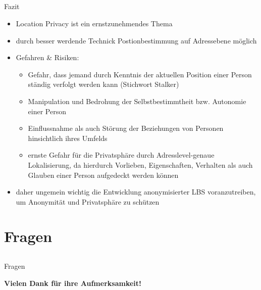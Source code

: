 \subsection{}
\begin{frame}{Fazit}
\begin{itemize}
  \item Location Privacy ist ein ernstzunehmendes Thema
  \item durch besser werdende Technick Postionbestimmung auf Adressebene möglich
  \item Gefahren \& Risiken:
  \begin{itemize}
  \item Gefahr, dass jemand durch Kenntnis der aktuellen Position einer Person ständig verfolgt werden kann (Stichwort Stalker)
  \item Manipulation und Bedrohung der Selbstbestimmtheit bzw. Autonomie einer Person
  \item Einflussnahme als auch Störung der Beziehungen von Personen hinsichtlich ihres Umfelds
  \item ernste Gefahr für die Privatsphäre durch Adresslevel-genaue Lokalisierung, da hierdurch Vorlieben, Eigenschaften, Verhalten als auch Glauben einer Person aufgedeckt werden können  
  \end{itemize}
  \item daher ungemein wichtig die Entwicklung anonymisierter LBS voranzutreiben, um Anonymität und Privatsphäre zu schützen
\end{itemize}
\end{frame} 

\section{Fragen}
\subsection{}
\begin{frame}{Fragen}
\begin{minipage}{\textwidth}
  \begin{center}
    \Huge \textbf{Vielen Dank für ihre Aufmerksamkeit!}
    \vspace{1cm}
  \end{center}
\end{minipage}
\begin{minipage}{\textwidth}
  \begin{center}
  \end{center}
\end{minipage}
\end{frame}


